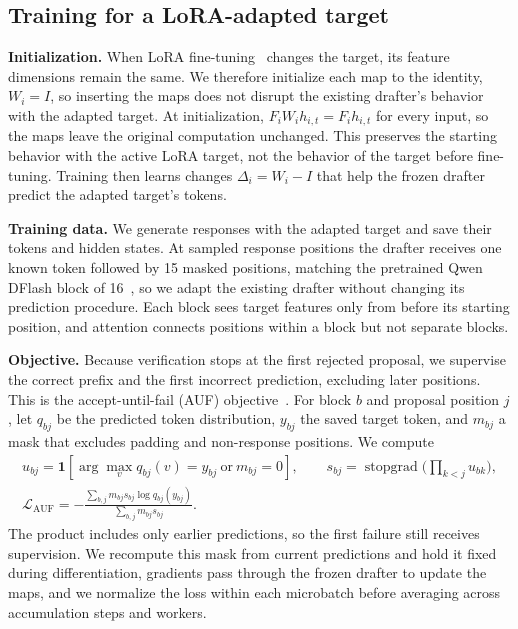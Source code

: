 \subsection{Training for a LoRA-adapted target}
\label{sec:method-auf}
\textbf{Initialization.} When LoRA fine-tuning~\citep{hu2022lora} changes the target, its feature dimensions remain the same. We therefore initialize each map to the identity, $W_i=I$, so inserting the maps does not disrupt the existing drafter's behavior with the adapted target. At initialization, $F_iW_ih_{i,t}=F_ih_{i,t}$ for every input, so the maps leave the original computation unchanged. This preserves the starting behavior with the active LoRA target, not the behavior of the target before fine-tuning. Training then learns changes $\Delta_i=W_i-I$ that help the frozen drafter predict the adapted target's tokens.

\textbf{Training data.} We generate responses with the adapted target and save their tokens and hidden states. At sampled response positions the drafter receives one known token followed by 15 masked positions, matching the pretrained Qwen DFlash block of 16~\citep{chen2026dflash}, so we adapt the existing drafter without changing its prediction procedure. Each block sees target features only from before its starting position, and attention connects positions within a block but not separate blocks.

\textbf{Objective.} Because verification stops at the first rejected proposal, we supervise the correct prefix and the first incorrect prediction, excluding later positions. This is the accept-until-fail (AUF) objective~\citep{yang2026specauf}. For block $b$ and proposal position $j$, let $q_{bj}$ be the predicted token distribution, $y_{bj}$ the saved target token, and $m_{bj}$ a mask that excludes padding and non-response positions. We compute
\begin{equation}
 \begin{gathered}
 u_{bj}=\mathbf 1\!\left[\arg\max_v q_{bj}(v)=y_{bj}\ \text{or}\ m_{bj}=0\right],
 \qquad s_{bj}=\operatorname{stopgrad}\bigl({\textstyle\prod_{k<j}u_{bk}}\bigr),\\
 \mathcal L_{\mathrm{AUF}}
 =-\frac{\sum_{b,j}m_{bj}s_{bj}\log q_{bj}(y_{bj})}
 {\sum_{b,j}m_{bj}s_{bj}}.
 \end{gathered}
 \label{eq:auf-method}
\end{equation}
The product includes only earlier predictions, so the first failure still receives supervision. We recompute this mask from current predictions and hold it fixed during differentiation, gradients pass through the frozen drafter to update the maps, and we normalize the loss within each microbatch before averaging across accumulation steps and workers.


